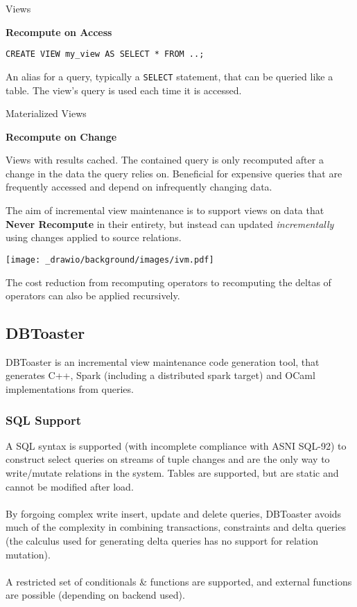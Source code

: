 \begin{tcbraster}[raster columns=2,raster equal height]
    \begin{definitionbox}{Views}
        \centerline{\textbf{Recompute on Access}}
        \begin{verbatim}
CREATE VIEW my_view AS SELECT * FROM ..;            
        \end{verbatim}
        An alias for a query, typically a \texttt{SELECT} statement, that can be queried like a table. The view's query is used each time it is accessed.\cite{Postgres16Docs}
    \end{definitionbox}
    \begin{definitionbox}{Materialized Views}
        \centerline{\textbf{Recompute on Change}}
        Views with results cached. The contained query is only recomputed after a change in the data the query relies on. Beneficial for expensive queries that are frequently accessed and depend on infrequently changing data.
    \end{definitionbox}
\end{tcbraster}
\noindent
The aim of incremental view maintenance is to support views on data that \textbf{Never Recompute} in their entirety, but instead can updated \textit{incrementally} using changes applied to source relations.
\begin{center}
    \texttt{[image: \_drawio/background/images/ivm.pdf]}
\end{center}
The cost reduction from recomputing operators to recomputing the deltas of operators can also be applied recursively.

\subsection{DBToaster}
DBToaster is an incremental view maintenance code generation tool, that generates C++, Spark (including a distributed spark target) and OCaml implementations from queries.
\subsubsection{SQL Support}
A SQL syntax is supported (with incomplete compliance with ASNI SQL-92) to construct select queries
on streams\cite{DBToasterSQLReference} of tuple changes and are the only way to write/mutate relations in the system.
Tables are supported, but are static and cannot be modified after load.
\\
\\ By forgoing complex write insert, update and delete queries, DBToaster avoids much of the complexity in combining
transactions, constraints and delta queries (the calculus used for generating delta queries has no support for
relation mutation).
\\
\\ A restricted set of conditionals \& functions are supported, and external functions are possible (depending on backend used).

